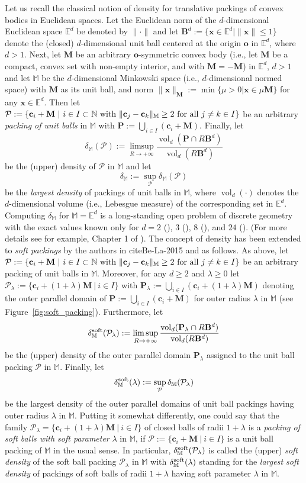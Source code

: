 \documentclass[11pt]{amsart}
\DeclareMathOperator{\vol}{vol}
\newcommand{\Eu}{\mathbb{E}}
\newcommand{\BB}{\mathbf{B}}
\newcommand{\M}{\mathbb{M}}
\newcommand{\N}{\mathbb{N}}
\newcommand{\MM}{\mathbf{M}}
\renewcommand{\P}{\mathcal{P}}
\newcommand{\x}{\mathbf{x}}
\renewcommand{\o}{\mathbf{o}}
\renewcommand{\c}{\mathbf{c}}
\theoremstyle{definition}
\numberwithin{equation}{section}
\begin{document}
Let us recall the classical notion of density for translative packings of convex bodies in Euclidean spaces. Let the Euclidean norm of the $d$-dimensional Euclidean space $\Eu^d$ be denoted by $\|\cdot\|$ and let $\BB^d:=\{\x\in \Eu^d | \|\x\|\leq 1\}$ denote the (closed) $d$-dimensional unit ball centered at the origin $\o$ in  $\Eu^d$, where $d>1$. Next,
let $\MM$ be an arbitrary $\o$-symmetric convex body (i.e., let $\MM$ be a compact, convex set with non-empty interior, and with $\MM=-\MM$) in $\Eu^d$, $d>1$ and let $\M$ be the $d$-dimensional Minkowski space (i.e., $d$-dimensional normed space) with $\MM$ as its unit ball, and norm $\| \x \|_{\MM}:=\min\{\mu>0 | \x\in\mu\MM\}$ for any $\x\in\Eu^d$.
Then let $\P:=\{\c_i+\MM\ |\ i\in I\subset\N \ {\rm with}\ \|\c_j-\c_k\|_{\M} \ge 2\ {\rm for}\ {\rm all}\ j\neq k\in I\}$ be an arbitrary {\it packing of unit balls} in $\M$ with $\mathbf{P}:=\bigcup_{i\in I}(\c_i+\MM)$. Finally, let
$$\delta_{\M}(\P):=\limsup_{R\to +\infty}\frac{\vol_d(\mathbf{P}\cap R\BB^d)}{\vol_d( R\BB^d) }$$
be the (upper) density of $\P$ in $\M$ and let
$$\delta_{\M}:=\sup_{\P}{\delta}_{\M}(\P) $$
be the {\it largest density} of packings of unit balls in $\M$, where $\vol_d(\cdot)$ denotes the $d$-dimensional volume (i.e., Lebesgue measure) of the corresponding set in $\Eu^d$. Computing $\delta_{\M}$ for $\M=\Eu^d$ is a long-standing open problem of discrete geometry with the exact values known only for $d=2$ (\cite{LFT50}), $3$ (\cite{L-05}), $8$ (\cite{V-17}), and $24$ (\cite{CKMRV}). (For more details see for example, Chapter 1 of \cite{Bezdek2013}). The concept of density has been extended to {\it soft packings} by the authors in cite{Be-La-2015} and \cite{Be-La-2024} as follows.  As above, let $\P:=\{\c_i+\MM\ |\ i\in I\subset\N \ {\rm with}\ \|\c_j-\c_k\|_{\M} \ge 2\ {\rm for}\ {\rm all}\ j\neq k\in I\}$ be an arbitrary packing of unit balls in $\M$. Moreover, for any $d\ge 2$  and $\lambda\ge 0$ let $\P_{\lambda}:=\{\c_i+(1+\lambda)\MM\ |\ i\in I\}$  with $\mathbf{P}_{\lambda}:=\bigcup_{i\in I}(\c_i+(1+\lambda)\MM)$ denoting the outer parallel domain of $\mathbf{P}:=\bigcup_{i\in I}(\c_i+\MM)$ for outer radius $\lambda$ in $\M$ (see Figure~\ref{fig:soft_packing}). Furthermore, let
$$\delta^{{\rm soft}}_{\M}(\P_{\lambda}):=\limsup_{R\to +\infty}\frac{\vol_d(\mathbf{P}_{\lambda}\cap R\BB^d)}{\vol_d(R\BB^d) }$$
be the (upper) density of the outer parallel domain $\mathbf{P}_{\lambda}$ assigned to the unit ball packing $\P$ in $\M$. Finally, let
$$\delta^{\rm soft}_{\M}(\lambda):=\sup_{\P}\delta_{\M}(\P_{\lambda})$$
be the largest density of the outer parallel domains of unit ball packings having outer radius $\lambda$ in $\M$. Putting it somewhat differently, one could say that the family $\P_{\lambda}=\{\c_i+(1+\lambda)\MM\ |\ i\in I\}$ of closed balls of radii $1+\lambda$ is a {\it packing of soft balls with soft parameter} $\lambda$  in $\M$, if $\P:=\{\c_i+\MM\ |\ i\in I\}$ is a unit ball packing  of $\M$ in the usual sense. In particular, $\delta^{\rm soft}_{\M}(\P_{\lambda})$ is called the (upper) {\it soft density} of the soft ball packing $\P_{\lambda}$  in $\M$ with
$\delta^{\rm soft}_{\M}(\lambda)$ standing for the {\it largest soft density} of packings of soft balls of radii $1+\lambda$ having soft parameter $\lambda$ in $\M$.
\end{document}
